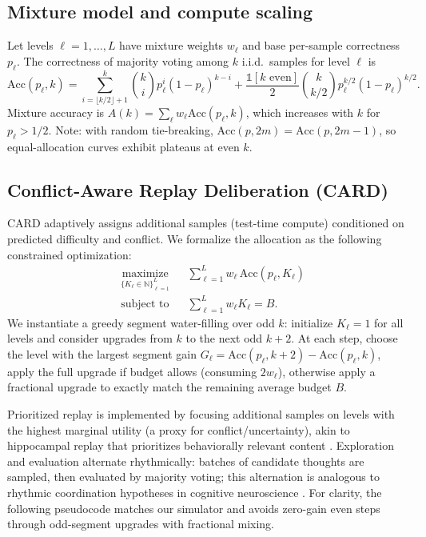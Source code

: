 \documentclass[11pt]{article}
\begin{document}
\subsection{Mixture model and compute scaling}
Let levels $\ell=1,\dots,L$ have mixture weights $w_\ell$ and base per-sample correctness $p_\ell$.
The correctness of majority voting among $k$ i.i.d.\ samples for level $\ell$ is
\[
\mathrm{Acc}(p_\ell,k) = \sum_{i=\lfloor k/2\rfloor + 1}^{k} \binom{k}{i} p_\ell^i (1-p_\ell)^{k-i} + \frac{\mathbb{1}[k \text{ even}]}{2}\binom{k}{k/2} p_\ell^{k/2}(1-p_\ell)^{k/2}.
\]
Mixture accuracy is $A(k)=\sum_{\ell} w_\ell \mathrm{Acc}(p_\ell,k)$, which increases with $k$ for $p_\ell>1/2$.
Note: with random tie-breaking, $\mathrm{Acc}(p,2m)=\mathrm{Acc}(p,2m{-}1)$, so equal-allocation curves exhibit plateaus at even $k$.

\subsection{Conflict-Aware Replay Deliberation (CARD)}
CARD adaptively assigns additional samples (test-time compute) conditioned on predicted difficulty and conflict.
We formalize the allocation as the following constrained optimization:
\begin{equation}
\label{eq:allocation}
\begin{aligned}
&\underset{\{K_\ell\in\mathbb{N}\}_{\ell=1}^L}{\text{maximize}} && \sum_{\ell=1}^{L} w_\ell \,\mathrm{Acc}(p_\ell,K_\ell)\\
&\text{subject to} && \sum_{\ell=1}^{L} w_\ell K_\ell = B.
\end{aligned}
\end{equation}
We instantiate a greedy segment water-filling over odd $k$: initialize $K_\ell \!=\! 1$ for all levels and consider upgrades from $k$ to the next odd $k{+}2$. At each step, choose the level with the largest segment gain
$G_\ell \!=\! \mathrm{Acc}(p_\ell,k{+}2) {-} \mathrm{Acc}(p_\ell,k)$,
apply the full upgrade if budget allows (consuming $2w_\ell$), otherwise apply a fractional upgrade to exactly match the remaining average budget $B$.

Prioritized replay is implemented by focusing additional samples on levels with the highest marginal utility (a proxy for conflict/uncertainty), akin to hippocampal replay that prioritizes behaviorally relevant content \citep{Mattar2018PrioritizedReplay,Schaul2016PER}.
Exploration and evaluation alternate rhythmically: batches of candidate thoughts are sampled, then evaluated by majority voting; this alternation is analogous to rhythmic coordination hypotheses in cognitive neuroscience \citep{Fries2015Rhythms}.
For clarity, the following pseudocode matches our simulator and avoids zero-gain even steps through odd-segment upgrades with fractional mixing.
\end{document}
